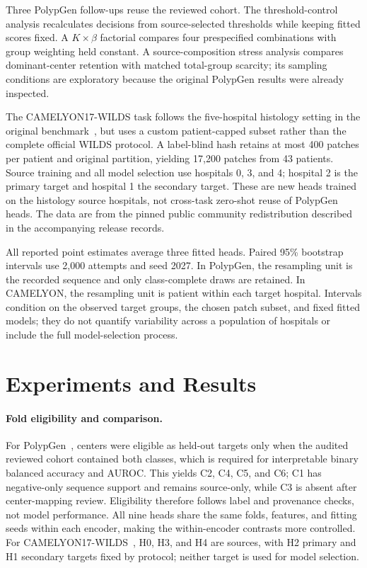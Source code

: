 Three PolypGen follow-ups reuse the reviewed cohort. The threshold-control analysis recalculates decisions from source-selected thresholds while keeping fitted scores fixed. A $K\times\beta$ factorial compares four prespecified combinations with group weighting held constant. A source-composition stress analysis compares dominant-center retention with matched total-group scarcity; its sampling conditions are exploratory because the original PolypGen results were already inspected.

The CAMELYON17-WILDS task follows the five-hospital histology setting in the original benchmark~\cite{bandi2019camelyon,koh2021wilds}, but uses a custom patient-capped subset rather than the complete official WILDS protocol. A label-blind hash retains at most 400 patches per patient and original partition, yielding 17,200 patches from 43 patients. Source training and all model selection use hospitals 0, 3, and 4; hospital 2 is the primary target and hospital 1 the secondary target. These are new heads trained on the histology source hospitals, not cross-task zero-shot reuse of PolypGen heads. The data are from the pinned public community redistribution described in the accompanying release records.

All reported point estimates average three fitted heads. Paired 95\% bootstrap intervals use 2,000 attempts and seed 2027. In PolypGen, the resampling unit is the recorded sequence and only class-complete draws are retained. In CAMELYON, the resampling unit is patient within each target hospital. Intervals condition on the observed target groups, the chosen patch subset, and fixed fitted models; they do not quantify variability across a population of hospitals or include the full model-selection process.

\section{Experiments and Results}
\label{sec:results}

\paragraph{Fold eligibility and comparison.}
For PolypGen~\cite{ali2023polypgen}, centers were eligible as held-out targets only when the audited reviewed cohort contained both classes, which is required for interpretable binary balanced accuracy and AUROC. This yields C2, C4, C5, and C6; C1 has negative-only sequence support and remains source-only, while C3 is absent after center-mapping review. Eligibility therefore follows label and provenance checks, not model performance. All nine heads share the same folds, features, and fitting seeds within each encoder, making the within-encoder contrasts more controlled. For CAMELYON17-WILDS~\cite{bandi2019camelyon,koh2021wilds}, H0, H3, and H4 are sources, with H2 primary and H1 secondary targets fixed by protocol; neither target is used for model selection.
